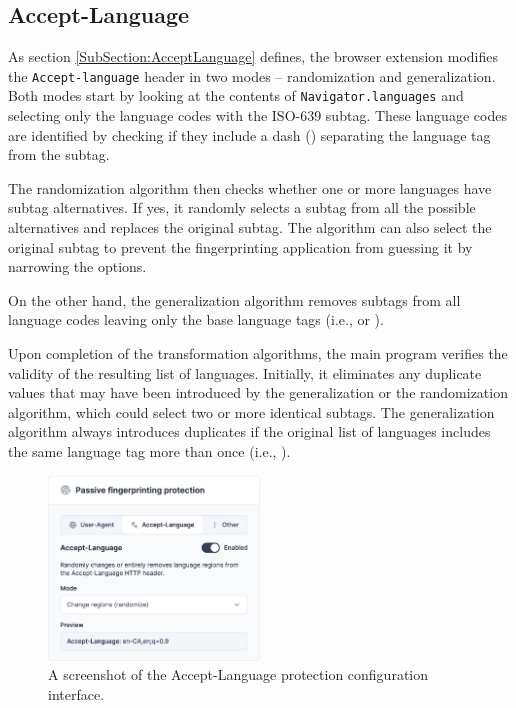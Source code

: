 
\subsection{Accept-Language}

As section \ref{SubSection:AcceptLanguage} defines, the browser extension modifies the \texttt{Accept-language} header in two modes -- randomization and generalization. Both modes start by looking at the contents of \texttt{Navigator.languages} and selecting only the language codes with the ISO-639 subtag. These language codes are identified by checking if they include a dash (\uv{-}) separating the language tag from the subtag.

The randomization algorithm then checks whether one or more languages have subtag alternatives. If yes, it randomly selects a subtag from all the possible alternatives and replaces the original subtag. The algorithm can also select the original subtag to prevent the fingerprinting application from guessing it by narrowing the options.

On the other hand, the generalization algorithm removes subtags from all language codes leaving only the base language tags (i.e.,  or ).

Upon completion of the transformation algorithms, the main program verifies the validity of the resulting list of languages. Initially, it eliminates any duplicate values that may have been introduced by the generalization or the randomization algorithm, which could select two or more identical subtags. The generalization algorithm always introduces duplicates if the original list of languages includes the same language tag more than once (i.e., ).

\begin{figure}[H]
    \centering
    \includegraphics[width=0.5\textwidth]{obrazky-figures/screenshot-accept-language}
    \caption{A screenshot of the Accept-Language protection configuration interface.}
\end{figure}

